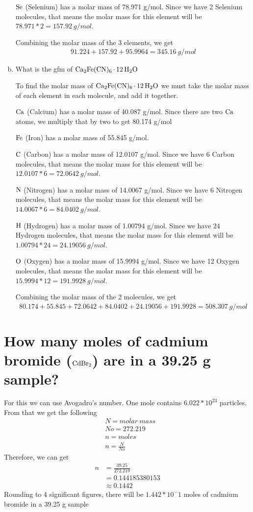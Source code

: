 \documentclass{scrartcl}
\begin{document}
\begin{enumerate}[(a)]
\(\ce{Se}\) (Selenium) has a molar mass of 78.971 g/mol. Since we have 2
Selenium molecules, that means the molar mass for this element will be
\(78.971*2=157.92\ g/mol\).

Combining the molar mass of the 3 elements, we get
\begin{align*}
91.224+157.92+95.9964=345.16\ g/mol
\end{align*}

\item What is the gfm of \(\ce{Ca2Fe(CN)6*12H2O}\)

 To find the molar mass of \(\ce{Ca2Fe(CN)6*12H2O}\) we must take the molar
mass of each element in each molecule, and add it together.

\(\ce{Ca}\) (Calcium) has a molar mass of 40.087 g/mol. Since there are two
  \(\ce{Ca}\) atoms, we multiply that by two to get 80.174 g/mol

\(\ce{Fe}\) (Iron) has a molar mass of 55.845 g/mol.

\(\ce{C}\) (Carbon) has a molar mass of 12.0107 g/mol. Since we have 6
Carbon molecules, that means the molar mass for this element will be
\(12.0107*6=72.0642\ g/mol\).

\(\ce{N}\) (Nitrogen) has a molar mass of 14.0067 g/mol. Since we have 6
Nitrogen molecules, that means the molar mass for this element will be
\(14.0067*6=84.0402\ g/mol\).

\(\ce{H}\) (Hydrogen) has a molar mass of 1.00794 g/mol. Since we have 24
Hydrogen molecules, that means the molar mass for this element will be
\(1.00794*24=24.19056\ g/mol\).

\(\ce{O}\) (Oxygen) has a molar mass of 15.9994 g/mol. Since we have 12
Oxygen molecules, that means the molar mass for this element will be
\(15.9994*12=191.9928\ g/mol\).

Combining the molar mass of the 2 molecules, we get
\begin{align*}
80.174+55.845+72.0642+84.0402+24.19056+191.9928=508.307\ g/mol
\end{align*}
\end{enumerate}

\section{How many moles of cadmium bromide (\(\ce{CdBr2}\)) are in a 39.25 g sample?}
\label{sec:orga651a5a}
For this we can use Avogadro's number. One mole contains \(6.022*10^{23}\) particles. From that we get the following
\begin{align*}
&N = molar\ mass\\
&No = 272.219\\
&n = moles\\
&n=\frac{N}{No}
\end{align*}
Therefore, we can get
\begin{align*}
n&= \frac{39.25}{272.219}\\
&=0.144185380153\\
&\approx0.1442
\end{align*}
Rounding to 4 significant figures, there will be \(1.442*10^-1\) moles of cadmium bromide in a 39.25 g sample
\end{document}
